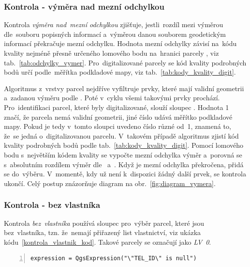 \subsubsection{Kontrola - výměra nad mezní odchylkou}
\label{kontrola_vymera}

Kontrola \textit{výměra nad~mezní odchylkou} zjišťuje, jestli~rozdíl mezi výměrou dle~souboru popisných informací a~výměrou danou souborem geodetickým informací překračuje mezní odchylku. Hodnota mezní odchylky závisí na~kódu kvality nejméně přesně určeného lomového bodu na~hranici parcely \citep{vyhlaska_357}, viz tab.~\ref{tab:odchylky_vymer}. Pro~digitalizované parcely se kód kvality podrobných bodů určí podle~měřítka podkladové mapy, viz tab.~\ref{tab:kody_kvality_digit}.

Algoritmus z~vrstvy parcel nejdříve vyfiltruje prvky, které mají validní geometrii a~zadanou výměru podle . Poté v~cyklu všemi takovými prvky prochází. Pro~identifikaci parcel, které byly digitalizované, slouží sloupec \texttt{}. Hodnota 1 značí, že parcela nemá validní geometrii, jiné číslo udává měřítko podkladové mapy. Pokud je tedy v~tomto sloupci uvedeno číslo různé od~1, znamená to, že~se jedná o~digitalizovanou parcelu. V~takovém případě algoritmus zjistí kód kvality podrobných bodů podle tab.~\ref{tab:kody_kvality_digit}. Pomocí lomového bodu s~největším kódem kvality se vypočte mezní odchylka výměr a~porovná se s~absolutním rozdílem výměr dle~ a~. Když je mezní odchylka překročena, přidá se do~výběru. V~momentě, kdy už není k~dispozici žádný další prvek, se kontrola ukončí. Celý postup znázorňuje diagram na obr.~\ref{fig:diagram_vymera}.

\subsubsection{Kontrola - bez vlastníka}
\label{kontrola_bez_vlastnika}

Kontrola \textit{bez~vlastníka} používá sloupec \texttt{} pro~výběr parcel, které jsou bez~vlastníka, tzn. že~nemají přiřazený list vlastnictví, viz ukázka kódu~\ref{kontrola_vlastnik_kod}. Takové parcely se označují jako \textit{LV~0}.

{\scriptsize
\begin{lstlisting}[style=python, caption={Kontrola \textit{bez~vlastníka} - vzorec pro~výběr prvků}, captionpos=b, label=kontrola_vlastnik_kod, backgroundcolor = \color{light-gray},  numbers=left]
expression = QgsExpression("\"TEL_ID\" is null")
\end{lstlisting}}

